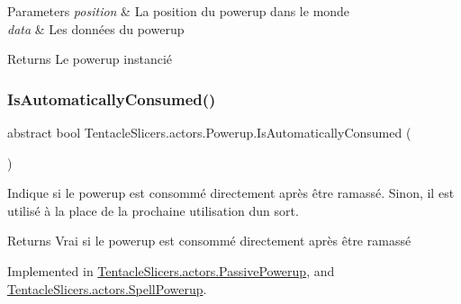 \begin{DoxyParams}{Parameters}
{\em position} & La position du powerup dans le monde \\
\hline
{\em data} & Les données du powerup \\
\hline
\end{DoxyParams}
\begin{DoxyReturn}{Returns}
Le powerup instancié 
\end{DoxyReturn}
\mbox{\label{class_tentacle_slicers_1_1actors_1_1_powerup_a31b3367e7a72d80526d92486472d329d}} 
\subsubsection{\texorpdfstring{Is\+Automatically\+Consumed()}{IsAutomaticallyConsumed()}}
{\footnotesize\ttfamily abstract bool Tentacle\+Slicers.\+actors.\+Powerup.\+Is\+Automatically\+Consumed (\begin{DoxyParamCaption}{ }\end{DoxyParamCaption})\hspace{0.3cm}{\ttfamily [pure virtual]}}



Indique si le powerup est consommé directement après être ramassé. Sinon, il est utilisé à la place de la prochaine utilisation d\textquotesingle{}un sort. 

\begin{DoxyReturn}{Returns}
Vrai si le powerup est consommé directement après être ramassé 
\end{DoxyReturn}


Implemented in \hyperlink{class_tentacle_slicers_1_1actors_1_1_passive_powerup_ac419aee4a7dfedee68728f747565f47f}{Tentacle\+Slicers.\+actors.\+Passive\+Powerup}, and \hyperlink{class_tentacle_slicers_1_1actors_1_1_spell_powerup_a9286f05a6eee9fb10532bf7439340bd8}{Tentacle\+Slicers.\+actors.\+Spell\+Powerup}.

\mbox{\label{class_tentacle_slicers_1_1actors_1_1_powerup_aed821572dc4831af53c26150736986d5}} 
